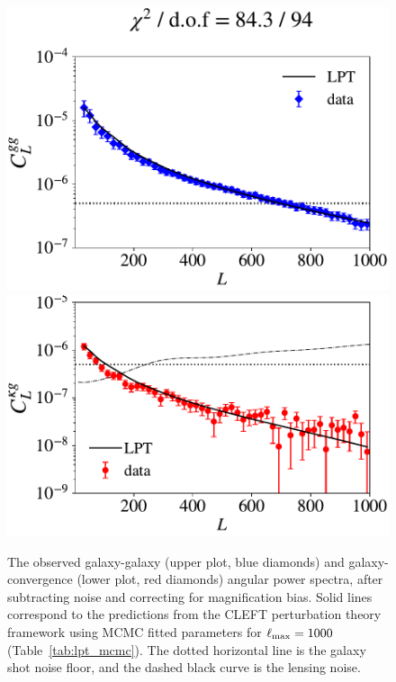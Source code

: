 \begin{figure}
\includegraphics[width=\linewidth]{figures/cl_gg_lpt.pdf}
\includegraphics[width=\linewidth]{figures/cl_kg_lpt.pdf}
\caption{The observed galaxy-galaxy (upper plot, blue diamonds) and galaxy-convergence (lower plot, red diamonds) angular power spectra, after subtracting noise and correcting for magnification bias. Solid lines correspond to the predictions from the CLEFT perturbation theory framework using MCMC fitted parameters for $\ell_{\rm max}=1000$ (Table~\ref{tab:lpt_mcmc}). The dotted horizontal line is the galaxy shot noise floor, and the dashed black curve is the lensing noise.}
\label{fig:cl_lptfit}
\end{figure}

